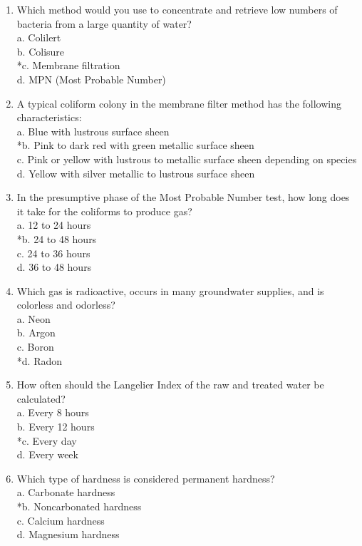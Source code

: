 \begin{enumerate}[1.]
  \item Which method would you use to concentrate and retrieve low numbers of bacteria from a large quantity of water?\\
a. Colilert\\
b. Colisure\\
*c. Membrane filtration\\
d. MPN (Most Probable Number)\\
  \item A typical coliform colony in the membrane filter method has the following characteristics:\\
a. Blue with lustrous surface sheen\\
*b. Pink to dark red with green metallic surface sheen\\
c. Pink or yellow with lustrous to metallic surface sheen depending on species\\
d. Yellow with silver metallic to lustrous surface sheen\\
  \item In the presumptive phase of the Most Probable Number test, how long does it take for the coliforms to produce gas?\\
a. 12 to 24 hours\\
*b. 24 to 48 hours\\
c. 24 to 36 hours\\
d. 36 to 48 hours\\

  \item Which gas is radioactive, occurs in many groundwater supplies, and is colorless and odorless?\\
a. Neon\\
b. Argon\\
c. Boron\\
*d. Radon\\

  \item How often should the Langelier Index of the raw and treated water be calculated?\\
a. Every 8 hours\\
b. Every 12 hours\\
*c. Every day\\
d. Every week\\

  \item Which type of hardness is considered permanent hardness?\\
a. Carbonate hardness\\
*b. Noncarbonated hardness\\
c. Calcium hardness\\
d. Magnesium hardness\\



\end{enumerate}
